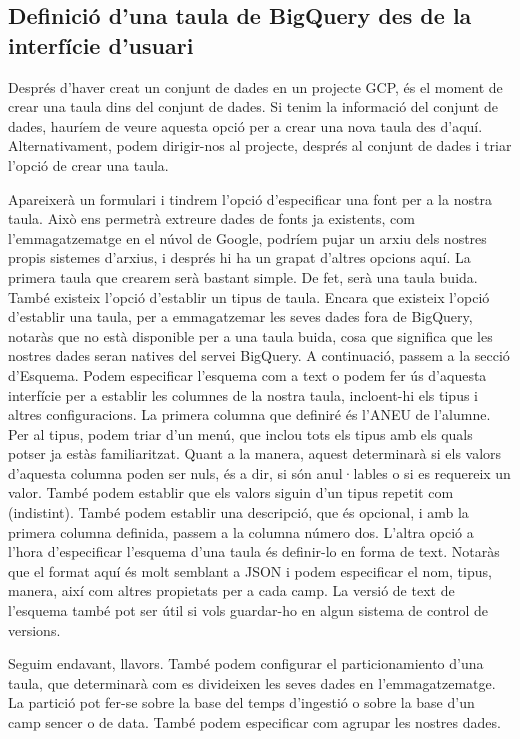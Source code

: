 \documentclass[12pt,longbibliography]{article}
\theoremstyle{definition}
\theoremstyle{remark}
\begin{document}
\subsection{Definició d'una taula de BigQuery des de la interfície d'usuari}

Després d'haver creat un conjunt de dades en un projecte GCP, és el moment de crear una taula dins del conjunt de dades. Si tenim la informació del conjunt de dades, hauríem de veure aquesta opció per a crear una nova taula des d'aquí. Alternativament, podem dirigir-nos al projecte, després al conjunt de dades i triar l'opció de crear una taula.

Apareixerà un formulari i tindrem l'opció d'especificar una font per a la nostra taula. Això ens permetrà extreure dades de fonts ja existents, com l'emmagatzematge en el núvol de Google, podríem pujar un arxiu dels nostres propis sistemes d'arxius, i després hi ha un grapat d'altres opcions aquí. La primera taula que crearem serà bastant simple. De fet, serà una taula buida. També existeix l'opció d'establir un tipus de taula. Encara que existeix l'opció d'establir una taula, per a emmagatzemar les seves dades fora de BigQuery, notaràs que no està disponible per a una taula buida, cosa que significa que les nostres dades seran natives del servei BigQuery. A continuació, passem a la secció d'Esquema. Podem especificar l'esquema com a text o podem fer ús d'aquesta interfície per a establir les columnes de la nostra taula, incloent-hi els tipus i altres configuracions. La primera columna que definiré és l'ANEU de l'alumne. Per al tipus, podem triar d'un menú, que inclou tots els tipus amb els quals potser ja estàs familiaritzat. Quant a la manera, aquest determinarà si els valors d'aquesta columna poden ser nuls, és a dir, si són anul·lables o si es requereix un valor. També podem establir que els valors siguin d'un tipus repetit com (indistint). També podem establir una descripció, que és opcional, i amb la primera columna definida, passem a la columna número dos. L'altra opció a l'hora d'especificar l'esquema d'una taula és definir-lo en forma de text. Notaràs que el format aquí és molt semblant a JSON i podem especificar el nom, tipus, manera, així com altres propietats per a cada camp. La versió de text de l'esquema també pot ser útil si vols guardar-ho en algun sistema de control de versions.

Seguim endavant, llavors. També podem configurar el particionamiento d'una taula, que determinarà com es divideixen les seves dades en l'emmagatzematge. La partició pot fer-se sobre la base del temps d'ingestió o sobre la base d'un camp sencer o de data. També podem especificar com agrupar les nostres dades.
\end{document}
